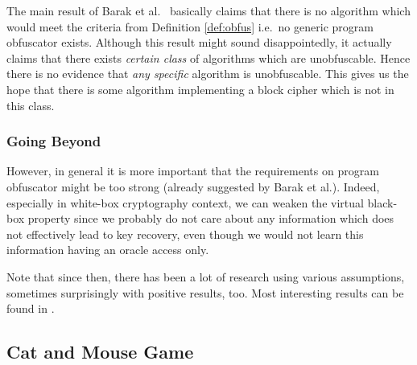 	The main result of Barak et al.\ \cite{barak2001possibility} basically claims that there is no algorithm which would meet the criteria from Definition \ref{def:obfus} i.e.\ no generic program obfuscator exists. Although this result might sound disappointedly, it actually claims that there exists {\em certain class} of algorithms which are unobfuscable. Hence there is no evidence that {\em any specific} algorithm is unobfuscable. This gives us the hope that there is some algorithm implementing a block cipher which is not in this class.

\subsubsection{Going Beyond}
	
	However, in general it is more important that the requirements on program obfuscator might be too strong (already suggested by Barak et al.). Indeed, especially in white-box cryptography context, we can weaken the virtual black-box property since we probably do not care about any information which does not effectively lead to key recovery, even though we would not learn this information having an oracle access only.
	
	Note that since then, there has been a lot of research using various assumptions, sometimes surprisingly with positive results, too. Most interesting results can be found in \cite{barak2014protecting, brakerski2014virtual}.



\subsection{Cat and Mouse Game}
\label{sec:catmouse}

